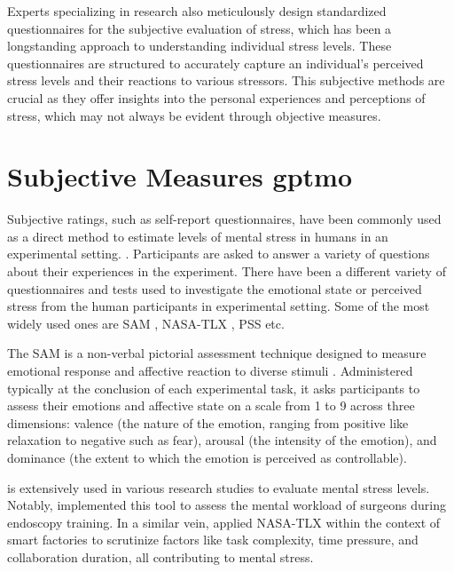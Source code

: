 Experts specializing in research also meticulously design standardized questionnaires for the subjective evaluation of stress, which has been a longstanding approach to understanding individual stress levels. These questionnaires are structured to accurately capture an individual's perceived stress levels and their reactions to various stressors. This subjective methods are crucial as they offer insights into the personal experiences and perceptions of stress, which may not always be evident through objective measures.

\section{Subjective Measures \gls{gptmo}} 
\label{sec:nasa-tlx}


Subjective ratings, such as self-report questionnaires, have
been commonly used as a direct method to estimate levels of mental stress in humans in an experimental setting.
\parencite{aigram}. Participants are asked to answer a variety of
questions about their experiences in the experiment. There have been a different variety of questionnaires and tests used to investigate the emotional state or perceived stress from the human participants in experimental setting. Some of the most widely used ones are \gls{SAM} \parencite{SAM}, \gls{NASA-TLX} \parencite{tlx}, \gls{PSS} \parencite{pss} etc.

 The \gls{SAM} is a non-verbal pictorial assessment technique designed to measure emotional response and affective reaction to diverse stimuli \parencite{SAM}. Administered typically at the conclusion of each experimental task, it asks participants to assess their emotions and affective state on a scale from 1 to 9 across three dimensions: valence (the nature of the emotion, ranging from positive like relaxation to negative such as fear), arousal (the intensity of the emotion), and dominance (the extent to which the emotion is perceived as controllable).


  is extensively used in various research studies to evaluate mental stress levels. Notably, \textcite{tlxstress} implemented this tool to assess the mental workload of surgeons during endoscopy training. In a similar vein, \textcite{Zaki} applied NASA-TLX within the context of smart factories to scrutinize factors like task complexity, time pressure, and collaboration duration, all contributing to mental stress.

